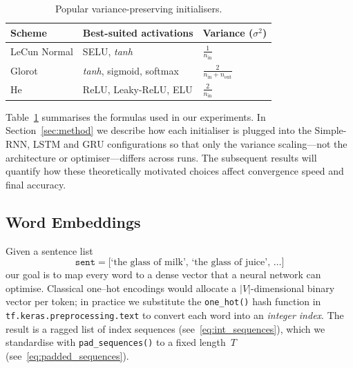 \documentclass[conference]{IEEEtran}
\begin{document}
\begin{table}[!t]
    \caption{Popular variance-preserving initialisers.}
    \label{tab:init_improved}
    \centering
    
    \renewcommand{\arraystretch}{1.4} 
    \setlength{\tabcolsep}{8pt} 
    
    \begin{tabular}{@{}l l l@{}}
        \toprule
        \textbf{Scheme} & \textbf{Best-suited activations} & \textbf{Variance} ($\sigma^2$) \\
        \midrule
        LeCun Normal \cite{lecun1998efficient}   & SELU, \textit{tanh}               & $\displaystyle\frac{1}{n_{\text{in}}}$ \\
        Glorot \cite{glorot2010understanding}     & \textit{tanh}, sigmoid, softmax   & $\displaystyle\frac{2}{n_{\text{in}}+n_{\text{out}}}$ \\
        He \cite{he2015delving}                   & ReLU, Leaky-ReLU, ELU           & $\displaystyle\frac{2}{n_{\text{in}}}$ \\
        \bottomrule
    \end{tabular}
\end{table}

Table~\ref{tab:init_improved} summarises the formulas used in our experiments.  In
Section~\ref{sec:method} we describe how each initialiser is plugged into the
Simple-RNN, LSTM and GRU configurations so that only the variance
scaling—not the architecture or optimiser—differs across runs.  The subsequent
results will quantify how these theoretically motivated choices affect
convergence speed and final accuracy.

\subsection{Word Embeddings}\label{sec:embeddings}

Given a sentence list
%
\[
\texttt{sent}=%
\bigl[\!\!\text{`the glass of milk'},\,
 \text{`the glass of juice'},\,
 \dots]
\]
%
our goal is to map every word to a dense vector that a neural network can
optimise.  Classical one–hot encodings would allocate a $\lvert V\rvert$-dimensional
binary vector per token; in practice we substitute the \texttt{one\_hot()} hash
function in \texttt{tf.keras.preprocessing.text} to convert each word into an
\emph{integer index}.  The result is a ragged list of index sequences
(see~\eqref{eq:int_sequences}), which we standardise with
\texttt{pad\_sequences()} to a fixed length~$T$ (see~\eqref{eq:padded_sequences}).
\end{document}
